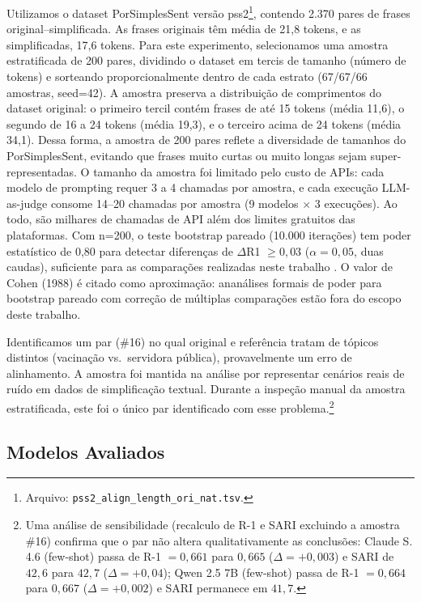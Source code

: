 \documentclass[a4paper, twocolumn, 11pt, twoside]{article}
\begin{document}
Utilizamos o dataset PorSimplesSent versão pss2\footnote{%
  Arquivo: \texttt{pss2\_align\_length\_ori\_nat.tsv}.}, contendo
2.370 pares de frases original--simplificada. As frases originais têm média de 21,8
tokens, e as simplificadas, 17,6 tokens. Para este experimento,
selecionamos uma amostra estratificada de 200 pares, dividindo o
dataset em tercis de tamanho (número de tokens) e sorteando
proporcionalmente dentro de cada estrato (67/67/66 amostras, seed=42).
A amostra preserva a distribuição
de comprimentos do dataset original: o primeiro tercil contém frases
de até 15 tokens (média 11,6), o segundo de 16 a 24 tokens (média
19,3), e o terceiro acima de 24 tokens (média 34,1). Dessa forma,
a amostra de 200 pares reflete a diversidade de tamanhos do
PorSimplesSent, evitando que frases muito curtas ou muito longas
sejam super-representadas. O tamanho da amostra foi limitado pelo
custo de APIs: cada modelo de prompting requer 3 a 4 chamadas por
amostra, e cada execução LLM-as-judge consome
14--20 chamadas por amostra (9 modelos $\times$ 3 execuções).
Ao todo, são milhares de chamadas de API além dos limites gratuitos
das plataformas. Com n=200, o teste bootstrap pareado (10.000
iterações) tem poder estatístico de 0,80 para detectar diferenças
de $\Delta$R1 $\geq 0,03$ ($\alpha = 0,05$, duas caudas),
suficiente para as comparações realizadas neste trabalho
\citep{cohen1988}. O valor de Cohen (1988) é citado como
aproximação: ananálises formais de poder para bootstrap
pareado com correção de múltiplas comparações estão
fora do escopo deste trabalho.

Identificamos um par (\#16) no qual original e referência tratam de
tópicos distintos (vacinação vs.\ servidora pública), provavelmente um
erro de alinhamento. A amostra foi mantida na análise por representar
cenários reais de ruído em dados de simplificação textual. Durante a
inspeção manual da amostra estratificada, este foi o único par
identificado com esse problema.\footnote{Uma análise de
sensibilidade (recalculo de R-1 e SARI excluindo a amostra
\#16) confirma que o par não altera qualitativamente as
conclusões: Claude S. 4.6 (few-shot) passa de R-1 $= 0{,}661$
para $0{,}665$ ($\Delta = +0{,}003$) e SARI de $42{,}6$ para
$42{,}7$ ($\Delta = +0{,}04$); Qwen 2.5 7B (few-shot) passa
de R-1 $= 0{,}664$ para $0{,}667$ ($\Delta = +0{,}002$) e SARI
permanece em $41{,}7$.}

\subsection{Modelos Avaliados}
\end{document}
